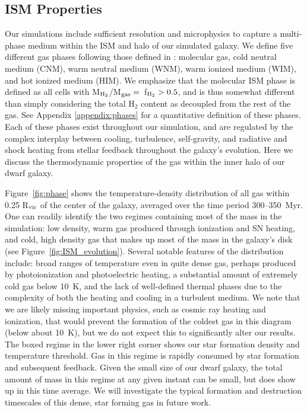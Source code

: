 \documentclass[twocolumn]{aastex61}
\begin{document}
\subsection{ISM Properties}
\label{sec:phase}

Our simulations include sufficient resolution and microphysics to capture a multi-phase medium within the ISM and halo of our simulated galaxy. We define five different gas phases following those defined in \citep{Draine2011}: molecular gas, cold neutral medium (CNM), warm neutral medium (WNM), warm ionized medium (WIM), and hot ionized medium (HIM). We emphasize that the molecular ISM phase is defined as all cells with M$_{\rm H_2}$/M$_{\rm gas} = $~f$_{\rm H_2} > 0.5$, and is thus somewhat different than simply considering the total H$_2$ content as decoupled from the rest of the gas. See Appendix \ref{appendix:phases} for a quantitative definition of these phases. Each of these phases exist throughout our simulation, and are regulated by the complex interplay between cooling, turbulence, self-gravity, and radiative and shock heating from stellar feedback throughout the galaxy's evolution. Here we discuss the thermodynamic properties of the gas within the inner halo of our dwarf galaxy.

Figure~\ref{fig:phase} shows the temperature-density distribution of all gas within 0.25 R$_{\rm vir}$ of the center of the galaxy, averaged over the time period 300--350~Myr. One can readily identify the two regimes containing most of the mass in the simulation: low density, warm gas produced through ionization and SN heating, and cold, high density gas that makes up most of the mass in the galaxy's disk (see Figure~\ref{fig:ISM_evolution}). Several notable features of the distribution include: broad ranges of temperature even in quite dense gas, perhaps produced by photoionization and photoelectric heating, a substantial amount of extremely cold gas below 10~K, and the lack of well-defined thermal phases due to the complexity of both the heating and cooling in a turbulent medium. We note that we are likely missing important physics, such as cosmic ray heating and ionization, that would prevent the formation of the coldest gas in this diagram (below about 10~K), but we do not expect this to significantly alter our results. The boxed regime in the lower right corner shows our star formation density and temperature threshold. Gas in this regime is rapidly consumed by star formation and subsequent feedback. Given the small size of our dwarf galaxy, the total amount of mass in this regime at any given instant can be small, but does show up in this time average. We will investigate the typical formation and destruction timescales of this dense, star forming gas in future work.
\end{document}
